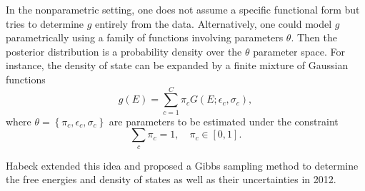 In the nonparametric setting, one does not assume a specific functional form but tries to determine $g$ entirely from the data. Alternatively, one could model $g$ parametrically using a family of functions involving parameters $\theta$. Then the posterior distribution is a probability density over the $\theta$ parameter space. For instance, the density of state can be expanded by a finite mixture of Gaussian functions 
\begin{equation}
    g(E)=\sum\limits_{c=1}^C \pi_c G(E;\epsilon_c,\sigma_c),
\end{equation}
where $\theta=\left\{\pi_c,\epsilon_c,\sigma_c\right\}$ are parameters to be estimated under the constraint
\begin{equation}
    \sum_c\pi_c=1,\quad \pi_c\in [0,1].
\end{equation}

Habeck extended this idea and proposed a Gibbs sampling method to determine the free energies and density of states as well as their uncertainties in 2012.\cite{HabeckPRL2012}

